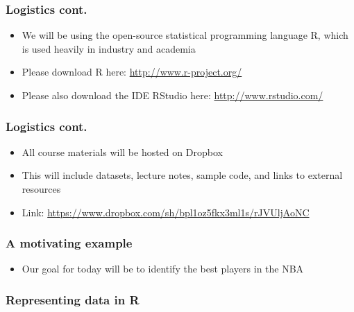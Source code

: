 \documentclass{beamer}
\begin{document}
\begin{frame}
\frametitle{Logistics cont.}
\begin{itemize}
	\item We will be using the open-source statistical programming language R, which is used heavily in industry and academia
	\item Please download R here: \url{http://www.r-project.org/}
	\item Please also download the IDE RStudio here: \url{http://www.rstudio.com/}
\end{itemize}
\end{frame}

\begin{frame}
\frametitle{Logistics cont.}
\begin{itemize}
	\item All course materials will be hosted on Dropbox
	\item This will include datasets, lecture notes, sample code, and links to external resources
	\item Link: \url{https://www.dropbox.com/sh/bpl1oz5fkx3ml1s/rJVUljAoNC}
\end{itemize}
\end{frame}

\begin{frame}
\frametitle{A motivating example}
\begin{itemize}
	\item Our goal for today will be to identify the best players in the NBA
\end{itemize}
\end{frame}


\begin{frame}
\frametitle{Representing data in R}
\end{frame}
\end{document}
